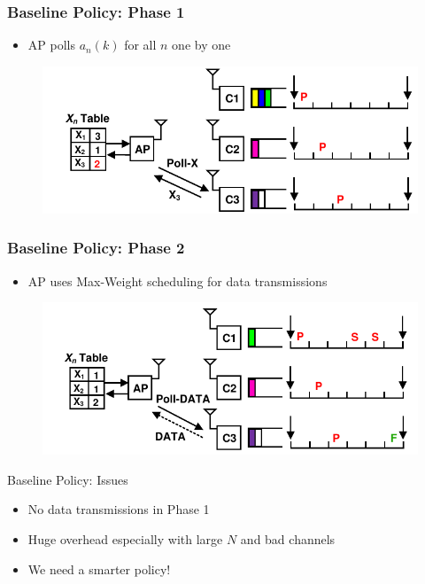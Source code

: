 \documentclass{beamer}
\begin{document}
\begin{frame}
\frametitle{Baseline Policy: Phase 1}
\begin{itemize}
\item AP polls $a_n(k)$ for all $n$ one by one
\end{itemize}
\begin{figure}
\centering
\includegraphics[scale=0.8]{animation_03.pdf}
\end{figure}
\end{frame}

\begin{frame}
\frametitle{Baseline Policy: Phase 2}
\begin{itemize}
\item AP uses Max-Weight scheduling for data transmissions
\end{itemize}
\begin{figure}
\centering
\includegraphics[scale=0.8]{animation_06.pdf}
\end{figure}
\end{frame}

\begin{frame}{Baseline Policy: Issues}
  \begin{itemize}
    \item No data transmissions in Phase 1
    \item Huge overhead especially with large $N$ and bad channels
    \item We need a smarter policy!
  \end{itemize}
\end{frame}
\end{document}
